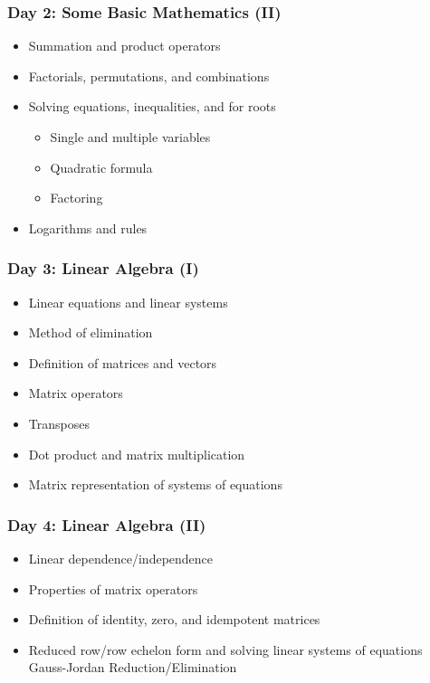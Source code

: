\documentclass[12pt]{article}
\begin{document}
\subsubsection*{Day 2: Some Basic Mathematics (II)}

\begin{itemize} \itemsep-0.35em
\item Summation and product operators
\item Factorials, permutations, and combinations
\item Solving equations, inequalities, and for roots
  \begin{itemize} \itemsep-0.35em
  \item Single and multiple variables
  \item Quadratic formula
  \item Factoring
  \end{itemize}
\item Logarithms and rules
\end{itemize}

\subsubsection*{Day 3: Linear Algebra (I)}

\begin{itemize} \itemsep-0.35em
\item Linear equations and linear systems
\item Method of elimination
\item Definition of matrices and vectors
\item Matrix operators
\item Transposes
\item Dot product and matrix multiplication
\item Matrix representation of systems of equations
\end{itemize}

\subsubsection*{Day 4: Linear Algebra (II)}

\begin{itemize} \itemsep-0.35em
\item Linear dependence/independence
\item Properties of matrix operators
\item Definition of identity, zero, and idempotent matrices
\item Reduced row/row echelon form and solving linear systems of equations
  Gauss-Jordan Reduction/Elimination
\end{itemize}
\end{document}
